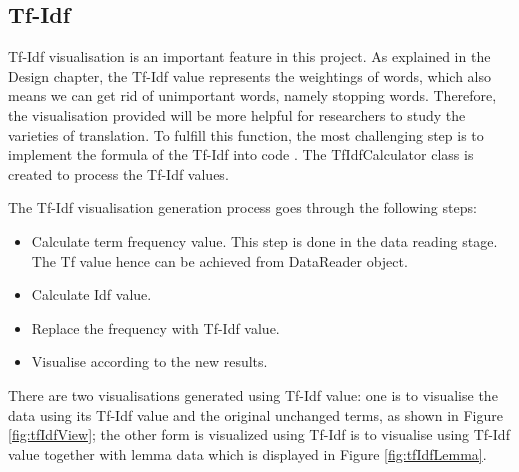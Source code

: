 \subsection{Tf-Idf}

Tf-Idf visualisation is an important feature in this project. As explained in the Design chapter, the Tf-Idf value represents the weightings of words, which also means we can get rid of unimportant words, namely stopping words. Therefore, the visualisation provided will be more helpful for researchers to study the varieties of translation. To fulfill this function, the most challenging step is to implement the formula of the Tf-Idf into code \cite{Manning2009}. The TfIdfCalculator class is created to process the Tf-Idf values.

The Tf-Idf visualisation generation process goes through the following steps:

\begin{itemize}
\item \textbf{} Calculate term frequency value. This step is done in the data reading stage. The Tf value hence can be achieved from DataReader object.
\item \textbf{} Calculate Idf value.  
\item \textbf{} Replace the frequency with Tf-Idf value.
\item \textbf{} Visualise according to the new results.
\end{itemize} 

There are two visualisations generated using Tf-Idf value: one is to visualise the data using its Tf-Idf value and the original unchanged terms, as shown in Figure \ref{fig:tfIdfView}; the other form is visualized using Tf-Idf is to visualise using Tf-Idf value together with lemma data which is displayed in Figure \ref{fig:tfIdfLemma}.

